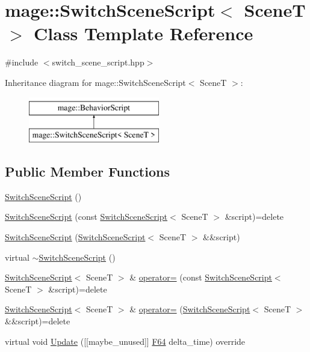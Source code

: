 \hypertarget{classmage_1_1_switch_scene_script}{}\section{mage\+:\+:Switch\+Scene\+Script$<$ SceneT $>$ Class Template Reference}
\label{classmage_1_1_switch_scene_script}


{\ttfamily \#include $<$switch\+\_\+scene\+\_\+script.\+hpp$>$}

Inheritance diagram for mage\+:\+:Switch\+Scene\+Script$<$ SceneT $>$\+:\begin{figure}[H]
\begin{center}
\leavevmode
\includegraphics[height=2.000000cm]{classmage_1_1_switch_scene_script}
\end{center}
\end{figure}
\subsection*{Public Member Functions}
\begin{DoxyCompactItemize}
\item 
\hyperlink{classmage_1_1_switch_scene_script_aefd104d1ddabdd4709c8682e89c79655}{Switch\+Scene\+Script} ()
\item 
\hyperlink{classmage_1_1_switch_scene_script_a307db08624888173ab256b387f07f1c4}{Switch\+Scene\+Script} (const \hyperlink{classmage_1_1_switch_scene_script}{Switch\+Scene\+Script}$<$ SceneT $>$ \&script)=delete
\item 
\hyperlink{classmage_1_1_switch_scene_script_a6803282c82656616ac7459b34e85fdc7}{Switch\+Scene\+Script} (\hyperlink{classmage_1_1_switch_scene_script}{Switch\+Scene\+Script}$<$ SceneT $>$ \&\&script)
\item 
virtual \hyperlink{classmage_1_1_switch_scene_script_a9c5907dfea7512a934e37136a9e3970b}{$\sim$\+Switch\+Scene\+Script} ()
\item 
\hyperlink{classmage_1_1_switch_scene_script}{Switch\+Scene\+Script}$<$ SceneT $>$ \& \hyperlink{classmage_1_1_switch_scene_script_afa17a58d641d05ac406fecb43c84ec2b}{operator=} (const \hyperlink{classmage_1_1_switch_scene_script}{Switch\+Scene\+Script}$<$ SceneT $>$ \&script)=delete
\item 
\hyperlink{classmage_1_1_switch_scene_script}{Switch\+Scene\+Script}$<$ SceneT $>$ \& \hyperlink{classmage_1_1_switch_scene_script_a9f78862b9432a35e9bd606e0be43966a}{operator=} (\hyperlink{classmage_1_1_switch_scene_script}{Switch\+Scene\+Script}$<$ SceneT $>$ \&\&script)=delete
\item 
virtual void \hyperlink{classmage_1_1_switch_scene_script_a9a92e2f108741599f121dd9083d4a89b}{Update} (\mbox{[}\mbox{[}maybe\+\_\+unused\mbox{]}\mbox{]} \hyperlink{namespacemage_ad26233bbec640deda836e572c1a23708}{F64} delta\+\_\+time) override
\end{DoxyCompactItemize}
